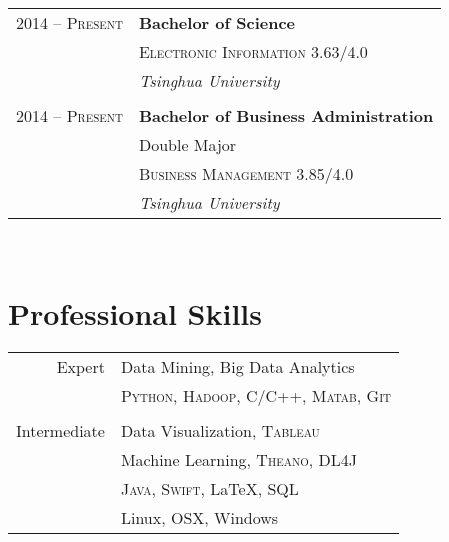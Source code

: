 \documentclass[10pt]{article} %
\begin{document}
{\begin{minipage}[t]{0.44\textwidth}
\begin{tabular}{rl}

2014 -- \textsc{Present} & \textbf{Bachelor of Science} \\ 
& \textsc{Electronic Information 3.63/4.0} \\ 
& \textit{Tsinghua University}\\
&\\
	 

2014 -- \textsc{Present} &  \textbf{Bachelor of Business Administration} \\ 
& \small Double Major \\
& \textsc{Business Management 3.85/4.0} \\ 
& \textit{Tsinghua University}\\



\end{tabular}\\[10pt]


\section{Professional Skills} 

\begin{tabular}{rl}
Expert
& Data Mining, Big Data Analytics \\
& \textsc{Python}, \textsc{Hadoop}, \textsc{C/C++}, \textsc{Matab}, \textsc{Git} \\
& \\
Intermediate
& Data Visualization, \textsc{Tableau} \\
& Machine Learning, \textsc{Theano}, \textsc{DL4J} \\
& \textsc{Java}, \textsc{Swift}, \LaTeX, \textsc{SQL} \\
& Linux, OSX, Windows \\
\end{tabular}



\end{minipage}}
\end{document}
